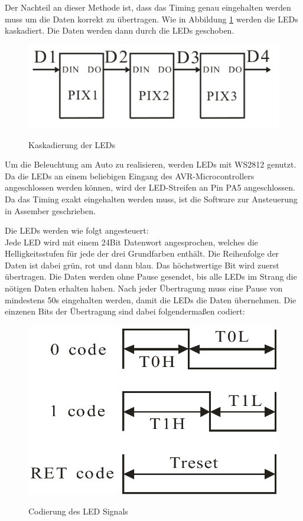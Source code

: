 Der Nachteil an dieser Methode ist, dass das Timing genau eingehalten werden muss um die Daten korrekt zu übertragen. Wie in Abbildung \ref{fig:led_cascade} werden die 
LEDs kaskadiert. Die Daten werden dann durch die LEDs geschoben.

\begin{figure}[H]
\centering
\includegraphics[width=.8\textwidth]{led_cascade.png}\\
\caption{Kaskadierung der LEDs \cite{ds-WS2812}}%
\label{fig:led_cascade}
\end{figure}

Um die Beleuchtung am Auto zu realisieren, werden LEDs mit WS2812 genutzt. Da die LEDs an einem beliebigen
Eingang des AVR-Microcontrollers angeschlossen werden können, wird der LED-Streifen an Pin PA5 angeschlossen. Da das Timing 
exakt eingehalten werden muss, ist die Software zur Ansteuerung in Assember geschrieben.

Die LEDs werden wie folgt angesteuert:\\
Jede LED wird mit einem 24Bit Datenwort angesprochen, welches die Helligkeitsstufen für jede der drei Grundfarben enthält. 
Die Reihenfolge der Daten ist dabei grün, rot und dann blau. Das höchstwertige Bit wird zuerst übertragen.
Die Daten werden ohne Pause gesendet, bis alle LEDs im Strang die nötigen Daten erhalten haben. Nach jeder Übertragung muss eine Pause von mindestens 50\textmu s eingehalten
werden, damit die LEDs die Daten übernehmen. Die einzenen Bits der Übertragung sind dabei folgendermaßen codiert:

\begin{figure}[H]
\centering
\includegraphics[width=.5\textwidth]{led_timing.png}\\
\caption{Codierung des LED Signals \cite{ds-WS2812}}%
\label{fig:led_timing}
\end{figure}

